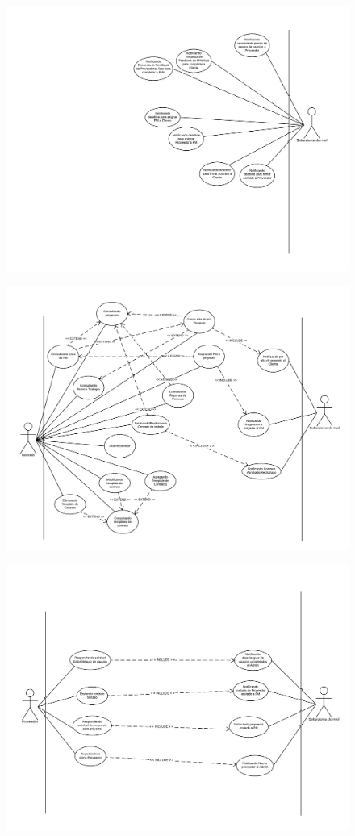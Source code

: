 \begin{figure}[H]
\includegraphics[width=\linewidth]{cu3.pdf}
\end{figure}
\begin{figure}[H]
\includegraphics[width=\linewidth]{cu4.pdf}
\end{figure}
\begin{figure}[H]
\includegraphics[width=\linewidth]{cu5.pdf}
\end{figure}
